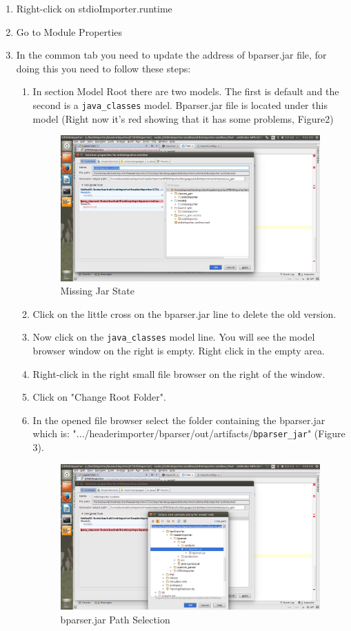 \documentclass{article}
\begin{document}
\begin{itemize}
\begin{enumerate}
\item
Right-click on stdioImporter.runtime
\item
Go to Module Properties
\item
In the common tab you need to update the address of bparser.jar file, for doing this you need to follow these steps:
\begin{enumerate}
\item
In section Model Root there are two models. The first is default and the second is a \texttt{java\_classes} model. Bparser.jar file is located under this model (Right now it's red showing that it has some problems, Figure2)
\begin{figure}[ht]
\caption{Missing Jar State}
\centering
\includegraphics[scale=0.5]{jarmissed.jpg}
\end{figure}
\item
Click on the little cross on the bparser.jar line to delete the old version.
\item
Now click on the \texttt{java\_classes} model line. You will see the model browser window on the right is empty. Right click in the empty area.
\item
Right-click in the right small file browser on the right of the window.
\item
Click on "Change Root Folder".
\item
In the opened file browser select the folder containing the bparser.jar which is: ".../headerimporter/bparser/out/artifacts/\texttt{bparser\_jar}" (Figure 3).
\begin{figure}[h]
\caption{bparser.jar Path Selection}
\centering
\includegraphics[scale=0.3]{selectpath.jpg}

\end{figure}
\end{enumerate}
\end{enumerate}
\end{itemize}
\end{document}
